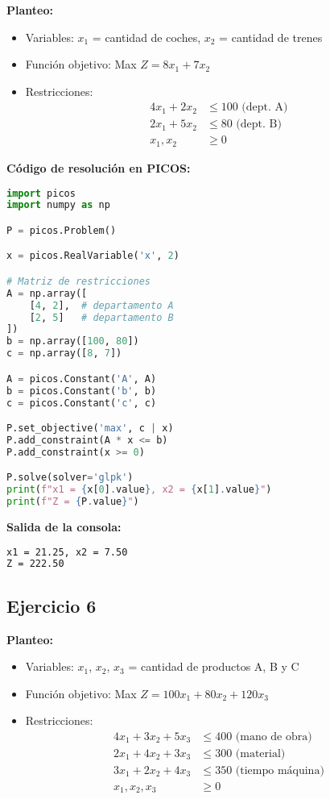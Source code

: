 \documentclass[12pt]{article}
\begin{document}
\textbf{Planteo:}
\begin{itemize}
\item Variables: $x_1$ = cantidad de coches, $x_2$ = cantidad de trenes
\item Función objetivo: Max $Z = 8x_1 + 7x_2$
\item Restricciones:
  \begin{align*}
  4x_1 + 2x_2 &\leq 100 \text{ (dept. A)} \\
  2x_1 + 5x_2 &\leq 80 \text{ (dept. B)} \\
  x_1, x_2 &\geq 0
  \end{align*}
\end{itemize}

\textbf{Código de resolución en PICOS:}
\begin{lstlisting}[language=Python]
import picos
import numpy as np

P = picos.Problem()

x = picos.RealVariable('x', 2)

# Matriz de restricciones
A = np.array([
    [4, 2],  # departamento A
    [2, 5]   # departamento B
])
b = np.array([100, 80])
c = np.array([8, 7])

A = picos.Constant('A', A)
b = picos.Constant('b', b)
c = picos.Constant('c', c)

P.set_objective('max', c | x)
P.add_constraint(A * x <= b)
P.add_constraint(x >= 0)

P.solve(solver='glpk')
print(f"x1 = {x[0].value}, x2 = {x[1].value}")
print(f"Z = {P.value}")
\end{lstlisting}

\textbf{Salida de la consola:}
\begin{lstlisting}[language=bash,backgroundcolor=\color{black},basicstyle=\color{white}\ttfamily,numbers=none]
x1 = 21.25, x2 = 7.50
Z = 222.50
\end{lstlisting}

\subsection{Ejercicio 6}

\textbf{Planteo:}
\begin{itemize}
\item Variables: $x_1$, $x_2$, $x_3$ = cantidad de productos A, B y C
\item Función objetivo: Max $Z = 100x_1 + 80x_2 + 120x_3$
\item Restricciones:
  \begin{align*}
  4x_1 + 3x_2 + 5x_3 &\leq 400 \text{ (mano de obra)} \\
  2x_1 + 4x_2 + 3x_3 &\leq 300 \text{ (material)} \\
  3x_1 + 2x_2 + 4x_3 &\leq 350 \text{ (tiempo máquina)} \\
  x_1, x_2, x_3 &\geq 0
  \end{align*}
\end{itemize}
\end{document}
